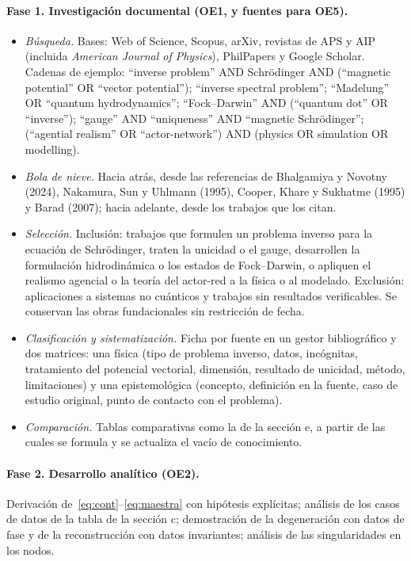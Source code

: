 \documentclass[12pt,letterpaper]{article}
\begin{document}
\paragraph{Fase 1. Investigación documental (OE1, y fuentes para OE5).}
\begin{itemize}[leftmargin=1.6em]
  \item \emph{Búsqueda.} Bases: Web of Science, Scopus, arXiv, revistas de APS y AIP (incluida \emph{American Journal of
        Physics}), PhilPapers y Google Scholar. Cadenas de ejemplo: ``inverse problem'' AND Schrödinger AND (``magnetic
        potential'' OR ``vector potential''); ``inverse spectral problem''; ``Madelung'' OR ``quantum hydrodynamics'';
        ``Fock--Darwin'' AND (``quantum dot'' OR ``inverse''); ``gauge'' AND ``uniqueness'' AND ``magnetic Schrödinger'';
        (``agential realism'' OR ``actor-network'') AND (physics OR simulation OR modelling).
  \item \emph{Bola de nieve.} Hacia atrás, desde las referencias de Bhalgamiya y Novotny (2024), Nakamura, Sun y Uhlmann
        (1995), Cooper, Khare y Sukhatme (1995) y Barad (2007); hacia adelante, desde los trabajos que los citan.
  \item \emph{Selección.} Inclusión: trabajos que formulen un problema inverso para la ecuación de Schrödinger, traten la
        unicidad o el gauge, desarrollen la formulación hidrodinámica o los estados de Fock--Darwin, o apliquen el
        realismo agencial o la teoría del actor-red a la física o al modelado. Exclusión: aplicaciones a sistemas no
        cuánticos y trabajos sin resultados verificables. Se conservan las obras fundacionales sin restricción de fecha.
  \item \emph{Clasificación y sistematización.} Ficha por fuente en un gestor bibliográfico y dos matrices: una física
        (tipo de problema inverso, datos, incógnitas, tratamiento del potencial vectorial, dimensión, resultado de
        unicidad, método, limitaciones) y una epistemológica (concepto, definición en la fuente, caso de estudio original,
        punto de contacto con el problema).
  \item \emph{Comparación.} Tablas comparativas como la de la sección e, a partir de las cuales se formula y se actualiza
        el vacío de conocimiento.
\end{itemize}

\paragraph{Fase 2. Desarrollo analítico (OE2).} Derivación de~\eqref{eq:cont}--\eqref{eq:maestra} con hipótesis
explícitas; análisis de los casos de datos de la tabla de la sección c; demostración de la degeneración con datos de fase
y de la reconstrucción con datos invariantes; análisis de las singularidades en los nodos.
\end{document}
